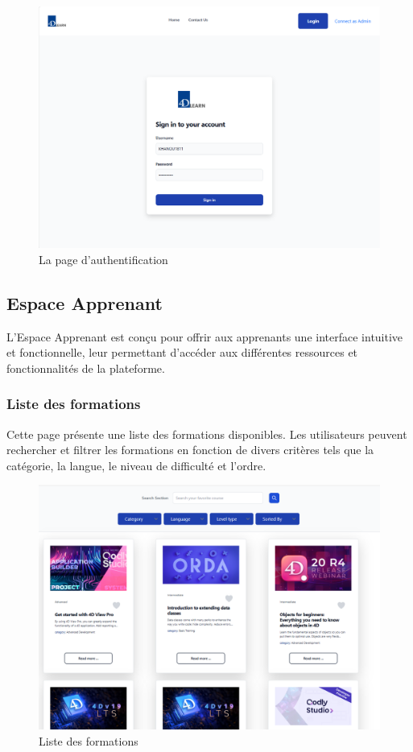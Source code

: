 \begin{figure}[H]
    \centering
    \includegraphics[width=19cm]{Figures/authntification.png}
    \caption{La page d'authentification}
\end{figure}

\subsection{Espace Apprenant }

L'Espace Apprenant est conçu pour offrir aux apprenants une interface intuitive et fonctionnelle, leur permettant d'accéder aux différentes ressources et fonctionnalités de la plateforme.

\subsubsection{Liste des formations}

Cette page présente une liste des formations disponibles. Les utilisateurs peuvent rechercher et filtrer les formations en fonction de divers critères tels que la catégorie, la langue, le niveau de difficulté et l’ordre.


\begin{figure}[H]
    \centering
    \includegraphics[width=19cm]{Figures/formations.png}
    \caption{Liste des formations}
\end{figure}


